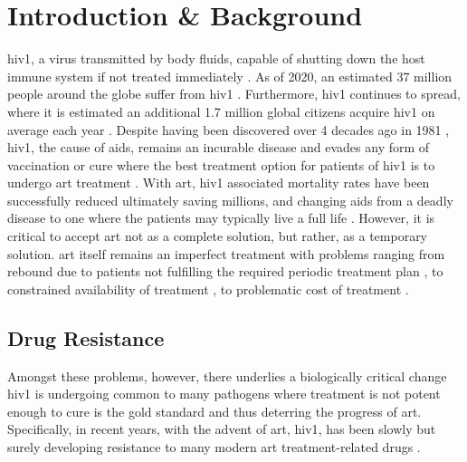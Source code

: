 \section{Introduction \& Background}

\ac{hiv1}, a virus transmitted by body fluids, capable of shutting down the host immune system if not treated immediately \cite{scutchfieldAIDSUpdate1989}. As of 2020, an estimated 37 million people around the globe suffer from \ac{hiv1} \cite{venturaHumanImmunodeficiencyVirus2020}. Furthermore, \ac{hiv1} continues to spread, where it is estimated an additional 1.7 million global citizens acquire \ac{hiv1} on average each year \cite{venturaHumanImmunodeficiencyVirus2020}. Despite having been discovered over 4 decades ago in 1981 \cite{sharpOriginsHIVAIDS2011}, \ac{hiv1}, the cause of \ac{aids}, remains an incurable disease and evades any form of vaccination or cure \cite{venturaHumanImmunodeficiencyVirus2020} where the best treatment option for patients of \ac{hiv1} is to undergo \ac{art} treatment \cite{phanuphakHIVTreatmentPrevention2020}. With \ac{art}, \ac{hiv1} associated mortality rates have been successfully reduced ultimately saving millions, and changing \ac{aids} from a deadly disease to one where the patients may typically live a full life \cite{venturaHumanImmunodeficiencyVirus2020}. However, it is critical to accept \ac{art} not as a complete solution, but rather, as a temporary solution. \ac{art} itself remains an imperfect treatment with problems ranging from rebound due to patients not fulfilling the required periodic treatment plan \cite{buellLifelongAntiretroviralTherapy2016}, to constrained availability of treatment \cite{schoutenAntiretroviralDrugSupply2011}, to problematic cost of treatment \cite{kahnCostEffectivenessAntiretroviralTherapy2011,sharpOriginsHIVAIDS2011}.

\subsection{Drug Resistance}

Amongst these problems, however, there underlies a biologically critical change \ac{hiv1} is undergoing common to many pathogens where treatment is not potent enough to cure is the gold standard and thus deterring the progress of \ac{art}. Specifically, in recent years, with the advent of \ac{art}, \ac{hiv1}, has been slowly but surely developing resistance to many modern \ac{art} treatment-related drugs \cite{clutterHIV1DrugResistance2016,fergusonHIV1ReplicationCycle2002,HIV1GeneticVariation2013}.

